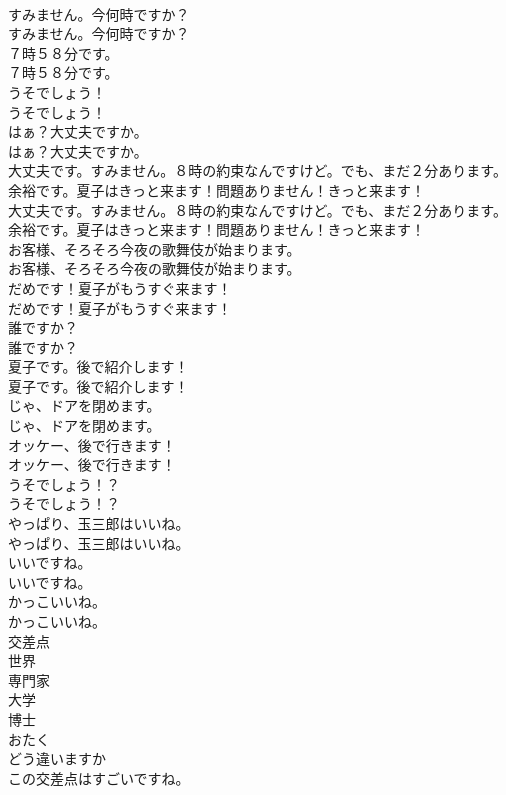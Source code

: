 \documentclass[8pt]{extreport}
\begin{document}
\begin{CJK}{UTF8}{min}
\\	すみません。今何時ですか？	
\\	すみません。今何時ですか？ 
\\	７時５８分です。	
\\	７時５８分です。 
\\	うそでしょう！	
\\	うそでしょう！ 
\\	はぁ？大丈夫ですか。	
\\	はぁ？大丈夫ですか。 
\\	大丈夫です。すみません。８時の約束なんですけど。でも、まだ２分あります。余裕です。夏子はきっと来ます！問題ありません！きっと来ます！	
\\	大丈夫です。すみません。８時の約束なんですけど。でも、まだ２分あります。余裕です。夏子はきっと来ます！問題ありません！きっと来ます！ 
\\	お客様、そろそろ今夜の歌舞伎が始まります。	
\\	お客様、そろそろ今夜の歌舞伎が始まります。 
\\	だめです！夏子がもうすぐ来ます！	
\\	だめです！夏子がもうすぐ来ます！ 
\\	誰ですか？	
\\	誰ですか？ 
\\	夏子です。後で紹介します！	
\\	夏子です。後で紹介します！ 
\\	じゃ、ドアを閉めます。	
\\	じゃ、ドアを閉めます。 
\\	オッケー、後で行きます！	
\\	オッケー、後で行きます！ 
\\	うそでしょう！？	
\\	うそでしょう！？ 
\\	やっぱり、玉三郎はいいね。	
\\	やっぱり、玉三郎はいいね。 
\\	いいですね。	
\\	いいですね。 
\\	かっこいいね。	
\\	かっこいいね。 
\\	交差点
\\	世界
\\	専門家
\\	大学
\\	博士
\\	おたく
\\	どう違いますか
\\	この交差点はすごいですね。	

\end{CJK}
\end{document}
